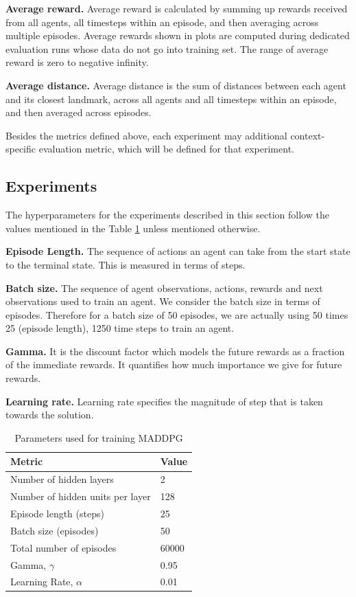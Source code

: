 \documentclass{article}
\begin{document}
\textbf{Average reward.} Average reward is calculated by summing up rewards received from all agents, all timesteps within an episode, and then averaging across multiple episodes. Average rewards shown in plots are computed during dedicated evaluation runs whose data do not go into training set. The range of average reward is zero to negative infinity. 

\textbf{Average distance.} Average distance is the sum of distances between each agent and its closest landmark, across all agents and all timesteps within an episode, and then averaged across episodes.

Besides the metrics defined above, each experiment may additional context-specific evaluation metric, which will be defined for that experiment.


\subsection{Experiments}

The hyperparameters for the experiments described in this section follow the values mentioned in the Table \ref{tab:basecase_parameters} unless mentioned otherwise.

\textbf{Episode Length.} The sequence of actions an agent can take from the start state to the terminal state. This is measured in terms of steps.

\textbf{Batch size.} The sequence of agent observations, actions, rewards and next observations used to train an agent. We consider the batch size in terms of episodes. Therefore for a batch size of 50 episodes, we are actually using 50 times 25 (episode length), 1250 time steps to train an agent.

\textbf{Gamma.} It is the discount factor which models the future rewards as a fraction of the immediate rewards. It quantifies how much importance we give for future rewards.

\textbf{Learning rate.} Learning rate specifies the magnitude of step that is taken towards the solution. 

\begin{table}[h!]
  \begin{center}
    \caption{Parameters used for training MADDPG}
    \label{tab:basecase_parameters}
    \begin{tabular} {|l|l|} %
      \hline
      \textbf{Metric} & \textbf{Value} \\
      \hline
      Number of hidden layers & 2 \\
      Number of hidden units per layer & 128 \\
      Episode length (steps) & 25 \\
      Batch size (episodes) & 50 \\
      Total number of episodes & 60000 \\
      Gamma, $\gamma$ & 0.95 \\
      Learning Rate, $\alpha$ & 0.01 \\
      \hline
    \end{tabular}
  \end{center}
\end{table}
\end{document}
